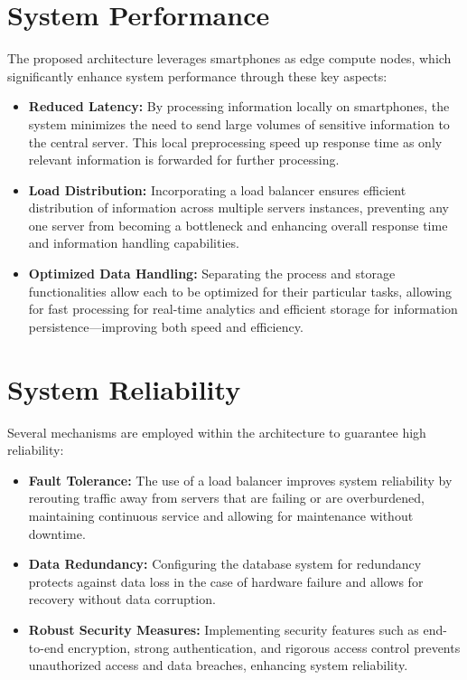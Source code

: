 \section{System Performance}

The proposed architecture leverages smartphones as edge compute nodes, which
significantly enhance system performance through these key aspects:

\begin{itemize}
    \item \textbf{Reduced Latency:} By processing information locally on
          smartphones, the system minimizes the need to send large volumes of
          sensitive information to the central server. This local preprocessing
          speed up response time as only relevant information is forwarded for
          further processing. \cite{ning2020mobile}
    \item \textbf{Load Distribution:} Incorporating a load balancer ensures
          efficient distribution of information across multiple servers
          instances, preventing any one server from becoming a bottleneck and
          enhancing overall response time and information handling capabilities.
    \item \textbf{Optimized Data Handling:} Separating the process and storage
          functionalities allow each to be optimized for their particular tasks,
          allowing for fast processing for real-time analytics and efficient
          storage for information persistence—improving both speed and
          efficiency. \cite{liu2024integrating}
\end{itemize}

\section{System Reliability}

Several mechanisms are employed within the architecture to guarantee high
reliability:

\begin{itemize}
    \item \textbf{Fault Tolerance:} The use of a load balancer improves system
          reliability by rerouting traffic away from servers that are failing or
          are overburdened, maintaining continuous service and allowing for
          maintenance without downtime.
    \item \textbf{Data Redundancy:} Configuring the database system for
          redundancy protects against data loss in the case of hardware failure
          and allows for recovery without data corruption.
    \item \textbf{Robust Security Measures:} Implementing security features such
          as end-to-end encryption, strong authentication, and rigorous access
          control prevents unauthorized access and data breaches, enhancing
          system reliability. \cite{pool2024systematic}
\end{itemize}

